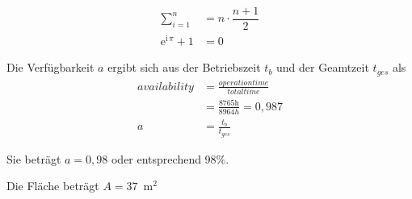 \begin{align}
\sum_{i=1}^n &=n \cdot \dfrac{n+1}{2} \\
\text{e}^{\text{i}\,\pi} + 1 & = 0  %
\end{align}

Die Verfügbarkeit $a$ ergibt sich aus der Betriebszeit $t_{b}$ und der Geamtzeit $t_{ges}$ als
\begin{align}
availability &= \frac{operation time}{total time}  \\
&= \frac{8765 \text{h}}{8964 h} = 0,987\\
a &= \frac{t_b}{t_{ges}}
\end{align}

Sie beträgt $a = 0{,}98$ oder entsprechend 98\%. %

Die Fläche beträgt $A = 37$~m$^2$

\clearpage